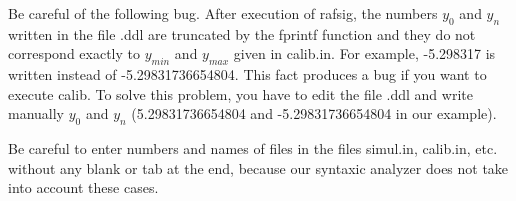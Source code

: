 \documentclass[12pt]{article}
\begin{document}
Be careful of the following bug. After execution of rafsig, 
the numbers $y_0$ and $y_n$ written in the file .ddl are 
truncated by the fprintf function and they do not correspond 
exactly to $y_{min}$ and $y_{max}$ given in calib.in. For 
example, -5.298317 is written instead of -5.29831736654804. 
This fact produces a bug if you want to execute calib. To 
solve this problem, you have to edit the file .ddl and 
write manually $y_0$ and $y_n$ (5.29831736654804 and 
-5.29831736654804 in our example).

Be careful to enter numbers and names of files in the 
files simul.in, calib.in, etc. without any blank or 
tab at the end, because our syntaxic analyzer does not 
take into account these cases.

\newpage


\end{document}
